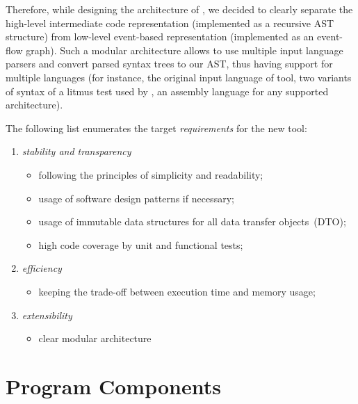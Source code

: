 Therefore, while designing the architecture of \porthos[2], we decided to clearly separate the high-level intermediate code representation (implemented as a recursive AST structure) from low-level event-based representation (implemented as an event-flow graph).
Such a modular architecture allows to use multiple input language parsers and convert parsed syntax trees to our AST, thus having support for multiple languages (for instance, the original input language of \porthos{} tool, two variants of syntax of a litmus test used by , an assembly language for any supported architecture).

The following list enumerates the target \textit{requirements} for the new tool:

\begin{enumerate}[nolistsep]
    \item \textit{stability and transparency}
        \begin{itemize}
            \item following the principles of simplicity and readability;
            \item usage of software design patterns if necessary;
            \item usage of immutable data structures for all data transfer objects~(DTO);
            \item high code coverage by unit and functional tests;
        \end{itemize}
    \item \textit{efficiency}
        \begin{itemize}[leftmargin=1em]
            \item keeping the trade-off between execution time and memory usage;
        \end{itemize}
    \item \textit{extensibility}
        \begin{itemize}[leftmargin=1em]
            \item clear modular architecture
        \end{itemize}
\end{enumerate}



\section{Program Components}
\label{ch:impl:comp}

